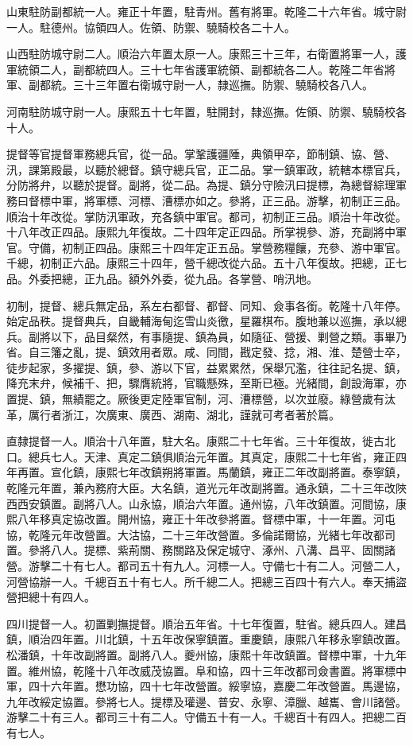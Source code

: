 \begin{pinyinscope}
山東駐防副都統一人。雍正十年置，駐青州。舊有將軍。乾隆二十六年省。城守尉一人。駐德州。協領四人。佐領、防禦、驍騎校各二十人。

山西駐防城守尉二人。順治六年置太原一人。康熙三十三年，右衛置將軍一人，護軍統領二人，副都統四人。三十七年省護軍統領、副都統各二人。乾隆二年省將軍、副都統。三十三年置右衛城守尉一人，隸巡撫。防禦、驍騎校各八人。

河南駐防城守尉一人。康熙五十七年置，駐開封，隸巡撫。佐領、防禦、驍騎校各十人。

提督等官提督軍務總兵官，從一品。掌鞏護疆陲，典領甲卒，節制鎮、協、營、汛，課第殿最，以聽於總督。鎮守總兵官，正二品。掌一鎮軍政，統轄本標官兵，分防將弁，以聽於提督。副將，從二品。為提、鎮分守險汛曰提標，為總督綜理軍務曰督標中軍，將軍標、河標、漕標亦如之。參將，正三品。游擊，初制正三品。順治十年改從。掌防汛軍政，充各鎮中軍官。都司，初制正三品。順治十年改從。十八年改正四品。康熙九年復故。二十四年定正四品。所掌視參、游，充副將中軍官。守備，初制正四品。康熙三十四年定正五品。掌營務糧饟，充參、游中軍官。千總，初制正六品。康熙三十四年，營千總改從六品。五十八年復故。把總，正七品。外委把總，正九品。額外外委，從九品。各掌營、哨汛地。

初制，提督、總兵無定品，系左右都督、都督、同知、僉事各銜。乾隆十八年停。始定品秩。提督典兵，自畿輔海甸迄雪山炎徼，星羅棋布。腹地兼以巡撫，承以總兵。副將以下，品目粲然，有事隨提、鎮為員，如隨征、營援、剿營之類。事畢乃省。自三籓之亂，提、鎮效用者眾。咸、同間，戡定發、捻，湘、淮、楚營士卒，徒步起家，多擢提、鎮，參、游以下官，益累累然，保舉冗濫，往往記名提、鎮，降充末弁，候補千、把，驟膺統將，官職懸殊，至斯已極。光緒間，創設海軍，亦置提、鎮，無績罷之。厥後更定陸軍官制，河、漕標營，以次並廢。綠營歲有汰革，厲行者浙江，次廣東、廣西、湖南、湖北，謹就可考者著於篇。

直隸提督一人。順治十八年置，駐大名。康熙二十七年省。三十年復故，徙古北口。總兵七人。天津、真定二鎮俱順治元年置。其真定，康熙二十七年省，雍正四年再置。宣化鎮，康熙七年改鎮朔將軍置。馬蘭鎮，雍正二年改副將置。泰寧鎮，乾隆元年置，兼內務府大臣。大名鎮，道光元年改副將置。通永鎮，二十三年改陜西西安鎮置。副將八人。山永協，順治六年置。通州協，八年改鎮置。河間協，康熙八年移真定協改置。開州協，雍正十年改參將置。督標中軍，十一年置。河屯協，乾隆元年改營置。大沽協，二十三年改營置。多倫諾爾協，光緒七年改都司置。參將八人。提標、紫荊關、務關路及保定城守、涿州、八溝、昌平、固關諸營。游擊二十有七人。都司五十有九人。河標一人。守備七十有二人。河營二人，河營協辦一人。千總百五十有七人。所千總二人。把總三百四十有六人。奉天捕盜營把總十有四人。

四川提督一人。初置剿撫提督。順治五年省。十七年復置，駐省。總兵四人。建昌鎮，順治四年置。川北鎮，十五年改保寧鎮置。重慶鎮，康熙八年移永寧鎮改置。松潘鎮，十年改副將置。副將八人。夔州協，康熙十年改鎮置。督標中軍，十九年置。維州協，乾隆十八年改威茂協置。阜和協，四十三年改都司僉書置。將軍標中軍，四十六年置。懋功協，四十七年改營置。綏寧協，嘉慶二年改營置。馬邊協，九年改綏定協置。參將七人。提標及瓘邊、普安、永寧、漳臘、越巂、會川諸營。游擊二十有三人。都司三十有二人。守備五十有一人。千總百十有四人。把總二百有七人。


\end{pinyinscope}
